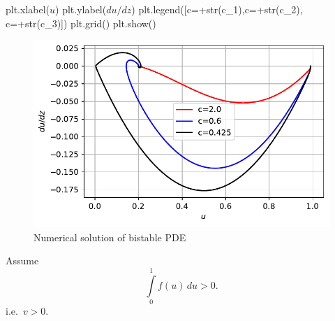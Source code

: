 \documentclass[
  letterpaper,
  DIV=11,
  numbers=noendperiod]{scrreprt}
\newenvironment{Shaded}{\begin{snugshade}}{\end{snugshade}}
\newcommand{\BuiltInTok}[1]{\textcolor[rgb]{0.00,0.23,0.31}{#1}}
\newcommand{\NormalTok}[1]{\textcolor[rgb]{0.00,0.23,0.31}{#1}}
\newcommand{\OperatorTok}[1]{\textcolor[rgb]{0.37,0.37,0.37}{#1}}
\newcommand{\StringTok}[1]{\textcolor[rgb]{0.13,0.47,0.30}{#1}}
\theoremstyle{plain}
\theoremstyle{definition}
\theoremstyle{plain}
\theoremstyle{remark}
\begin{document}
\begin{Shaded}
\begin{Highlighting}[]
\NormalTok{plt.xlabel(}\StringTok{\textquotesingle{}$u$\textquotesingle{}}\NormalTok{)}
\NormalTok{plt.ylabel(}\StringTok{\textquotesingle{}$du/dz$\textquotesingle{}}\NormalTok{)}
\NormalTok{plt.legend([}\StringTok{\textquotesingle{}c=\textquotesingle{}}\OperatorTok{+}\BuiltInTok{str}\NormalTok{(c\_1),}\StringTok{\textquotesingle{}c=\textquotesingle{}}\OperatorTok{+}\BuiltInTok{str}\NormalTok{(c\_2), }\StringTok{\textquotesingle{}c=\textquotesingle{}}\OperatorTok{+}\BuiltInTok{str}\NormalTok{(c\_3)])}
\NormalTok{plt.grid()}
\NormalTok{plt.show()}
\end{Highlighting}
\end{Shaded}

\begin{figure}[H]

{\centering \includegraphics{nonlinearreactiondiffusion_files/figure-pdf/fig-bistablenumtravwave-output-1.pdf}

}

\caption{\label{fig-bistablenumtravwave}Numerical solution of bistable
PDE}

\end{figure}

Assume \[
 \int\limits_{0}^{1}f(u) \, du > 0.
\] i.e.~\(v>0\).
\end{document}

